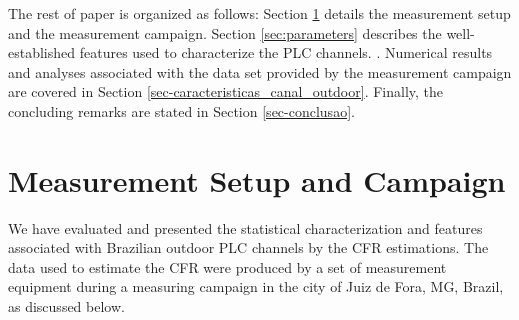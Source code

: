 \documentclass[journal]{IEEEtran}
\begin{document}
	The rest of paper is organized as follows: Section \ref{sec:campaign} \color{blue} details \color{black} the measurement setup and the measurement campaign. \color{black} 
	Section \ref{sec:parameters} \color{blue} describes the well-established features  used to characterize the \ac{PLC} channels. \color{black}.
	Numerical results and analyses associated with the data set provided by the measurement campaign are covered in  Section \ref{sec-caracteristicas_canal_outdoor}. 
	Finally, the concluding remarks are stated in Section \ref{sec-conclusao}.
	
	\section{Measurement Setup and Campaign}
	\label{sec:campaign}
	\color{blue} We have evaluated and presented the statistical characterization and features associated with Brazilian outdoor PLC channels by the \ac{CFR} estimations. \color{black}
	The data used to estimate the CFR were produced by a set of measurement equipment during a \color{blue} measuring campaign \color{black} in the city of Juiz de Fora, MG, Brazil, as discussed \color{blue} below.\color{black}
	
\end{document}
